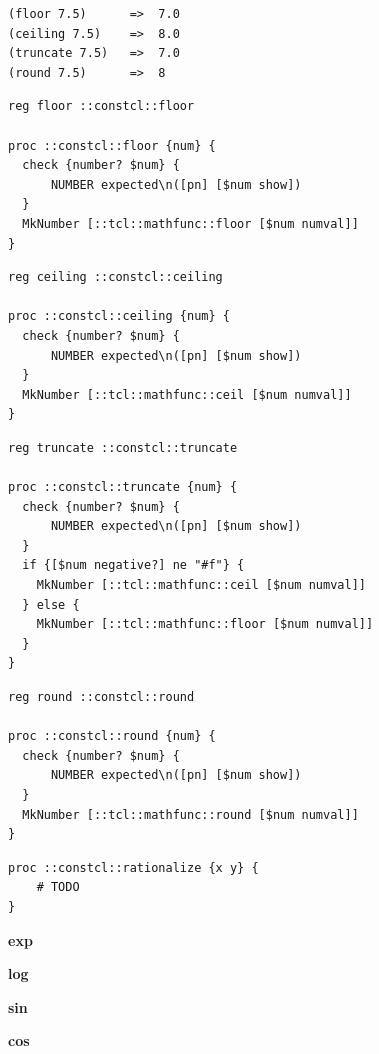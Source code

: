 \documentclass[twoside,9pt]{report}
\begin{document}
\noindent\makebox[\linewidth]{\rule{\linewidth}{0.4pt}}
\begin{lstlisting}
(floor 7.5)      =>  7.0
(ceiling 7.5)    =>  8.0
(truncate 7.5)   =>  7.0
(round 7.5)      =>  8
\end{lstlisting}
\noindent\makebox[\linewidth]{\rule{\linewidth}{0.4pt}}
\noindent\makebox[\linewidth]{\rule{\linewidth}{0.4pt}}
\begin{lstlisting}
reg floor ::constcl::floor
 
proc ::constcl::floor {num} {
  check {number? $num} {
      NUMBER expected\n([pn] [$num show])
  }
  MkNumber [::tcl::mathfunc::floor [$num numval]]
}
\end{lstlisting}
\noindent\makebox[\linewidth]{\rule{\linewidth}{0.4pt}}
\noindent\makebox[\linewidth]{\rule{\linewidth}{0.4pt}}
\begin{lstlisting}
reg ceiling ::constcl::ceiling
 
proc ::constcl::ceiling {num} {
  check {number? $num} {
      NUMBER expected\n([pn] [$num show])
  }
  MkNumber [::tcl::mathfunc::ceil [$num numval]]
}
\end{lstlisting}
\noindent\makebox[\linewidth]{\rule{\linewidth}{0.4pt}}
\noindent\makebox[\linewidth]{\rule{\linewidth}{0.4pt}}
\begin{lstlisting}
reg truncate ::constcl::truncate
 
proc ::constcl::truncate {num} {
  check {number? $num} {
      NUMBER expected\n([pn] [$num show])
  }
  if {[$num negative?] ne "#f"} {
    MkNumber [::tcl::mathfunc::ceil [$num numval]]
  } else {
    MkNumber [::tcl::mathfunc::floor [$num numval]]
  }
}
\end{lstlisting}
\noindent\makebox[\linewidth]{\rule{\linewidth}{0.4pt}}
\noindent\makebox[\linewidth]{\rule{\linewidth}{0.4pt}}
\begin{lstlisting}
reg round ::constcl::round
 
proc ::constcl::round {num} {
  check {number? $num} {
      NUMBER expected\n([pn] [$num show])
  }
  MkNumber [::tcl::mathfunc::round [$num numval]]
}
\end{lstlisting}
\noindent\makebox[\linewidth]{\rule{\linewidth}{0.4pt}}
\noindent\makebox[\linewidth]{\rule{\linewidth}{0.4pt}}
\begin{lstlisting}
proc ::constcl::rationalize {x y} {
    # TODO
}
\end{lstlisting}
\noindent\makebox[\linewidth]{\rule{\linewidth}{0.4pt}}

\textbf{exp}


\textbf{log}


\textbf{sin}


\textbf{cos}
\end{document}
